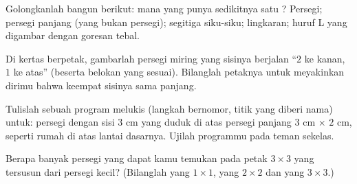 \begin{exercise}[$\star$]\label{exo:g3:shapes:8}
Golongkanlah bangun berikut: mana yang punya sedikitnya satu ? Persegi; persegi panjang (yang bukan persegi); segitiga
siku-siku; lingkaran; huruf L yang digambar dengan goresan tebal.
\end{exercise}

\begin{exercise}[$\star\star$]\label{exo:g3:shapes:9}
Di kertas berpetak, gambarlah persegi miring yang sisinya berjalan
``$2$ ke kanan, $1$ ke atas'' (beserta belokan yang sesuai).
Bilanglah petaknya untuk meyakinkan dirimu bahwa keempat sisinya sama panjang.
\end{exercise}

\begin{exercise}[$\star\star$]\label{exo:g3:shapes:10}
Tulislah sebuah program melukis (langkah bernomor, titik yang diberi
nama) untuk: persegi dengan sisi $3$ cm yang duduk di atas persegi
panjang $3$ cm $\times$ $2$ cm, seperti rumah di atas lantai
dasarnya. Ujilah programmu pada teman sekelas.
\end{exercise}

\begin{exercise}[$\star\star$]\label{exo:g3:shapes:11}
Berapa banyak persegi yang dapat kamu temukan pada petak
$3 \times 3$ yang tersusun dari persegi kecil? (Bilanglah yang
$1 \times 1$, yang $2 \times 2$ dan yang $3 \times 3$.)

\end{exercise}
